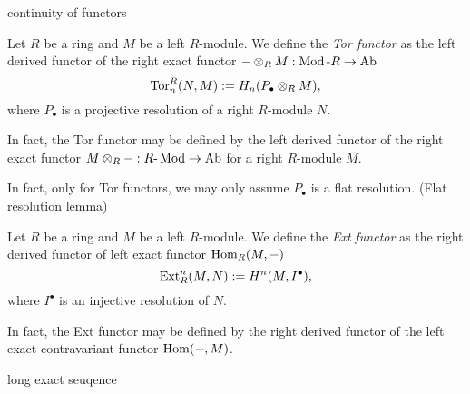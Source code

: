 \documentclass{../../large}
\begin{document}
continuity of functors

\begin{prb}
Let $R$ be a ring and $M$ be a left $R$-module.
We define the \emph{Tor functor} as the left derived functor of the right exact functor $-\otimes_RM:\operatorname{Mod}\text{-}R\to\mathrm{Ab}$
\[\operatorname{Tor}_n^R(N,M):=H_n(P_\bullet\otimes_RM),\]
where $P_\bullet$ is a projective resolution of a right $R$-module $N$.
\begin{parts}
\item In fact, the Tor functor may be defined by the left derived functor of the right exact functor $M\otimes_R-:R\text{-}\operatorname{Mod}\to\mathrm{Ab}$ for a right $R$-module $M$.
\item In fact, only for Tor functors, we may only assume $P_\bullet$ is a flat resolution. (Flat resolution lemma)
\end{parts}
\end{prb}

\begin{prb}
Let $R$ be a ring and $M$ be a left $R$-module.
We define the \emph{Ext functor} as the right derived functor of left exact functor $\operatorname{Hom}_R(M,-)$
\[\operatorname{Ext}_R^n(M,N):=H^n(M,I^\bullet),\]
where $I^\bullet$ is an injective resolution of $N$.
\begin{parts}
\item In fact, the Ext functor may be defined by the right derived functor of the left exact contravariant functor $\operatorname{Hom}(-,M)$.
\end{parts}
\end{prb}

long exact seuqence
\end{document}

